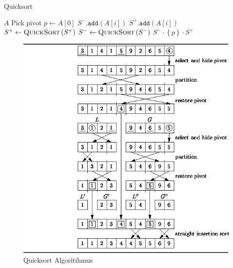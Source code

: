 \documentclass[a4paper]{article}
\begin{document}
    \begin{algorithm}[h]
        \caption{Quicksort}
        \begin{algorithmic}
            \label{alg:Quicksort}
        \State \Return $A$
        \EndIf
        \State Pick pivot $p \gets A[0]$
        \State $S^-\texttt{.add}\left(A\left[i\right]\right)$
        \Else
        \State $S^+\texttt{.add}\left(A\left[i\right]\right)$
        \EndIf
        \EndFor
        \State $S^+ \gets \textsc{QuickSort}\left(S^+\right)$
        \State $S^- \gets \textsc{QuickSort}\left(S^-\right)$
        \State \Return $S^- \cdot \left\lbrace p\right\rbrace \cdot S^+$
        \EndFunction
        \end{algorithmic}
        \end{algorithm}

\begin{figure}[h]
    \centering
    \includegraphics[scale = 0.4]{Pictures/Qcksort.jpeg}
    \caption{Quicksort Algoritihmus}
    \label{fig:QuickSort}
\end{figure}

        
\newpage
\end{document}
